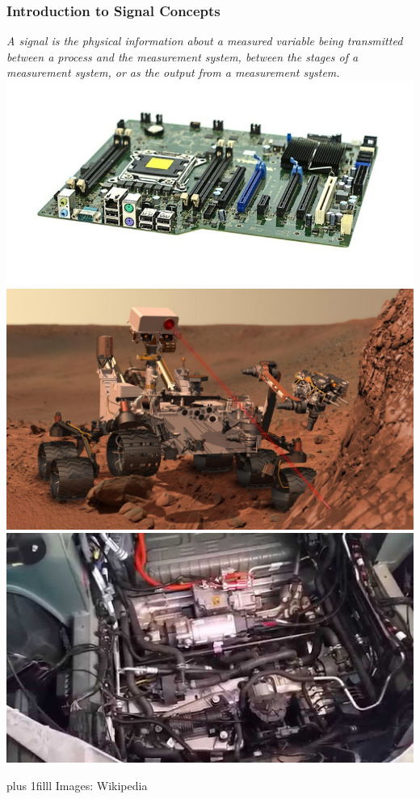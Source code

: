 \documentclass[fleqn]{beamer} %
\newcommand{\sectionIsubsectionItitle}{Introduction to Signal Concepts}
\newcommand{\btVFill}{\vskip0pt plus 1filll}
\begin{document}
			\begin{frame}
				\frametitle{\sectionIsubsectionItitle}

						\bigskip
		
		{\it A {\PR signal} is the physical information about a measured variable being transmitted
		between a process and the measurement system, between the stages of a measurement system, or as
		the output from a measurement system. } \\
	
		\includegraphics[scale=.07]{images/computer_motherboard.jpg} 
		\includegraphics[scale=.06]{images/curiosity_on_mars.jpg} 
		\includegraphics[scale=.22]{images/tesla_underhood.jpg}
		
		\btVFill
		\tiny{Images: Wikipedia}	

		

			\end{frame}
\end{document}
